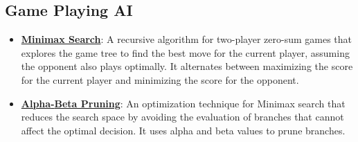 \documentclass{article}%
\begin{document}
\subsection{Game Playing AI}%
\label{subsec:GamePlayingAI}%
\begin{itemize}[leftmargin=*]%
\item \href{https://purdue.brightspace.com/d2l/common/assets/pdfjs-d2l-dist/1.0.14-legacy/web/viewer.html?file=\%2Fcontent\%2Fenforced\%2F1095467-wl.202510.CS.24300.001\%2F02L2-Intro.pdf\%3Fou\%3D1095467\&lang=en-us\&container=d2l-fileviewer-rendered-pdf\&fullscreen=d2l-fileviewer-rendered-pdf-dialog\&height=667#page=22}{\textbf{Minimax Search}}: A recursive algorithm for two{-}player zero{-}sum games that explores the game tree to find the best move for the current player, assuming the opponent also plays optimally. It alternates between maximizing the score for the current player and minimizing the score for the opponent.%
\item \href{https://purdue.brightspace.com/d2l/common/assets/pdfjs-d2l-dist/1.0.14-legacy/web/viewer.html?file=\%2Fcontent\%2Fenforced\%2F1095467-wl.202510.CS.24300.001\%2F02L2-Intro.pdf\%3Fou\%3D1095467\&lang=en-us\&container=d2l-fileviewer-rendered-pdf\&fullscreen=d2l-fileviewer-rendered-pdf-dialog\&height=667#page=23}{\textbf{Alpha{-}Beta Pruning}}: An optimization technique for Minimax search that reduces the search space by avoiding the evaluation of branches that cannot affect the optimal decision. It uses alpha and beta values to prune branches.%
\end{itemize}

%
\end{document}
